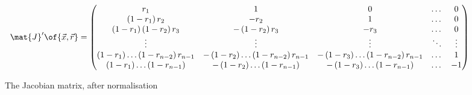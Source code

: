 \begin{figure*}
  \centering
  \tiny
  \begin{equation*}
    \mat{J}^{\prime} \of{\vec{x}, \vec{r}} = \begin{pmatrix}
      r_{1} & 1 & 0 & \dots & 0 \\
      \left( 1-r_{1} \right) r_{2} & -r_{2} & 1 & \dots & 0 \\
      \left( 1-r_{1} \right) \left( 1-r_{2} \right) r_{3} & -\left( 1-r_{2}
        \right) r_{3} & -r_{3} & \dots & 0 \\
      \vdots & \vdots & \vdots & \ddots & \vdots \\
      \left( 1-r_{1} \right) \dots \left( 1-r_{n-2} \right) r_{n-1} & 
        - \left( 1-r_{2} \right) \dots \left( 1-r_{n-2} \right) r_{n-1} & 
        - \left( 1-r_{3} \right) \dots \left( 1-r_{n-2} \right) r_{n-1} & \dots
        & 1 \\
      \left( 1-r_{1} \right) \dots \left( 1-r_{n-1} \right) &
        - \left( 1-r_{2} \right) \dots \left( 1-r_{n-1} \right) & 
        - \left( 1-r_{3} \right) \dots \left( 1-r_{n-1} \right) & \dots & -1
      \end{pmatrix}
  \end{equation*}
  \normalsize
  \caption{The Jacobian matrix, after normalisation}
  \label{fig:jacobian}
\end{figure*}

